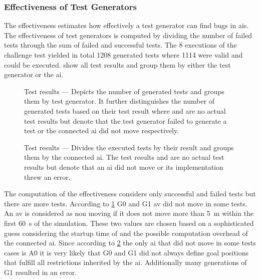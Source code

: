 \subsubsection{Effectiveness of Test Generators}
The effectiveness estimates how effectively a test generator can find bugs in \glspl{ai}.
The effectiveness of test generators is computed by dividing the number of failed tests through the sum of failed and successful tests.
The \num{8} executions of the challenge test yielded in total \num{1208} generated tests where \num{1114} were valid and could be executed.
 show all test results and group them by either the test generator or the \gls{ai}.
\begin{figure}
    
    \medskip
    \caption{%
        Test results --- Depicts the number of generated tests and groups them by test generator.
        It further distinguishes the number of generated tests based on their test result where  and  are no actual test results but denote that the test generator failed to generate a test or the connected \gls{ai} did not move respectively.
    }\label{fig:numTestsPerGenerator}
\end{figure}
\begin{figure}
    
    \medskip
    \caption{%
        Test results --- Divides the executed tests by their result and groups them by the connected \gls{ai}.
        The test results  and  are no actual test results but denote that an \gls{ai} did not move or its implementation threw an error.
    }\label{fig:numTestsPerAI}
\end{figure}
The computation of the effectiveness considers only successful and failed tests but there are more tests.
According to \cref{fig:numTestsPerGenerator} G0 and G1 \gls{av} did not move in some tests.
An \gls{av} is considered as non moving if it does not move more than \SI{5}{\metre} within the first \SI{60}{\second} of the simulation.
These two values are chosen based on a sophisticated guess considering the startup time of \beamng{} and the possible computation overhead of the connected \gls{ai}.
Since according to \cref{fig:numTestsPerAI} the only \gls{ai} that did not move in some tests cases is A0 it is very likely that G0 and G1 did not always define goal positions that fulfill all restrictions inherited by the \beamng{} \gls{ai}.
Additionally many generations of G1 resulted in an error.
